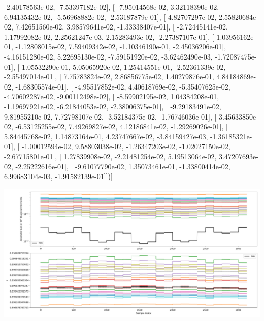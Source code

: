\documentclass{article}
\begin{document}
         -2.40178563e-02,  -7.53397182e-02],
       [ -7.95014568e-02,   3.32118390e-02,   6.94135432e-02,
         -5.56968882e-02,  -2.53187879e-01],
       [  4.82707297e-02,   2.55820684e-02,   7.42651560e-02,
          3.98579641e-02,  -1.33338407e-01],
       [ -2.72445141e-02,   1.17992082e-02,   2.25621247e-03,
          2.15283493e-02,  -2.27387107e-01],
       [  1.03956162e-01,  -1.12808015e-02,   7.59409342e-02,
         -1.10346190e-01,  -2.45036206e-01],
       [ -4.16151280e-02,   5.22695130e-02,  -7.59151920e-02,
         -3.62462490e-03,  -1.72087475e-01],
       [  1.05532290e-01,   5.05065920e-02,   1.25414551e-01,
         -2.52361339e-02,  -2.55497014e-01],
       [  7.75783824e-02,   2.86856775e-02,   1.40279876e-01,
          4.84184869e-02,  -1.68305574e-01],
       [ -4.95517852e-02,   4.40618769e-02,  -5.35407625e-02,
         -4.70602287e-02,  -9.00112498e-02],
       [ -8.59902195e-02,   1.04384208e-01,  -1.19697921e-02,
         -6.21844053e-02,  -2.38006375e-01],
       [ -9.29183491e-02,   9.81955210e-02,   7.72798107e-02,
         -3.52184375e-02,  -1.76746036e-01],
       [  3.45633850e-02,  -6.53125255e-02,   7.49269827e-02,
          4.12186841e-02,  -1.29269026e-01],
       [  5.84445768e-02,   1.14873164e-01,   4.23747667e-02,
         -3.84159427e-03,  -1.36185321e-01],
       [ -1.00012594e-02,   9.58803038e-02,  -1.26347203e-02,
         -1.02027150e-02,  -2.67715801e-01],
       [  1.27839908e-02,  -2.21481254e-02,   5.19513064e-02,
          3.47207693e-02,  -2.25222616e-01],
       [ -9.61077790e-02,   1.35073461e-01,  -1.33800414e-02,
          6.99683104e-03,  -1.91582139e-01]])]
\begin{center}
\includegraphics[scale=.9]{report_pickled_controls257/control_dpn_all.png}

\end{center}
\end{document}
